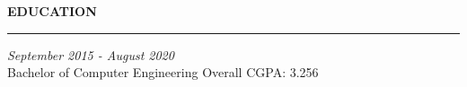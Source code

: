 \noindent\textcolor{themecolor}{\textbf{EDUCATION}}

\vspace{2mm}
\hrule
\vspace{3mm}
 \hfill {\em September 2015 - August 2020} 
\\ Bachelor of Computer Engineering\hfill { Overall CGPA: 3.256 }


